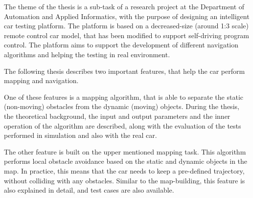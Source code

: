 The theme of the thesis is a sub-task of a research project at the Department of Automation and Applied Informatics, with the purpose of designing an intelligent car testing platform. The platform is based on a decreased-size (around 1:3 scale) remote control car model, that has been modified to support self-driving program control. The platform aims to support the development of different navigation algorithms and helping the testing in real environment.

The following thesis describes two important features, that help the car perform mapping and navigation.

One of these features is a mapping algorithm, that is able to separate the static (non-moving) obstacles from the dynamic (moving) objects. During the thesis, the theoretical background, the input and output parameters and the inner operation of the algorithm are described, along with the evaluation of the tests performed in simulation and also with the real car.

The other feature is built on the upper mentioned mapping task. This algorithm performs local obstacle avoidance based on the static and dynamic objects in the map. In practice, this means that the car needs to keep a pre-defined trajectory, without colliding with any obstacles. Similar to the map-building, this feature is also explained in detail, and test cases are also available.

\vfill
\selectthesislanguage

\setcounter{romanPage}{\value{page}}
\textbf{}